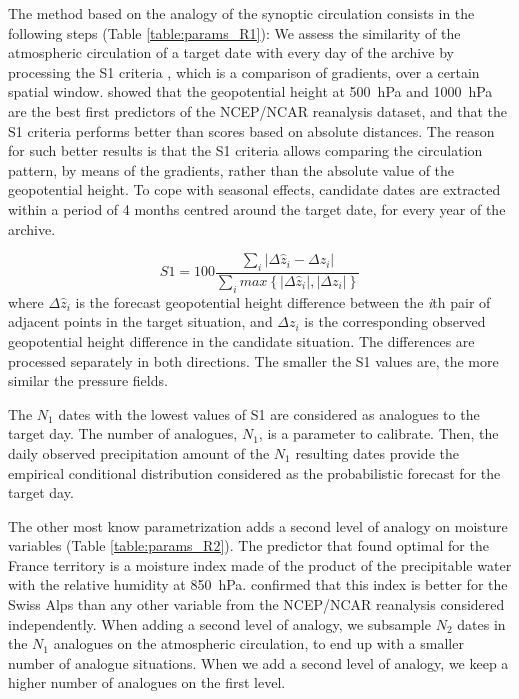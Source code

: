 \documentclass{ametsoc}
\begin{document}
The method based on the analogy of the synoptic circulation consists in the following steps (Table \ref{table:params_R1}): We assess the similarity of the atmospheric circulation of a target date with every day of the archive by processing the S1 criteria \citep[Eq.\ (\ref{eq:S1}), ][]{Teweles1954, Drosdowsky2003}, which is a comparison of gradients, over a certain spatial window. \citet{Bontron2005} showed that the geopotential height at 500~hPa and 1000~hPa are the best first predictors of the NCEP/NCAR reanalysis dataset, and that the S1 criteria performs better than scores based on absolute distances. The reason for such better results is that the S1 criteria allows comparing the circulation pattern, by means of the gradients, rather than the absolute value of the geopotential height. To cope with seasonal effects, candidate dates are extracted within a period of 4 months centred around the target date, for every year of the archive.

\begin{equation}
\label{eq:S1}
S1=100 \frac {\displaystyle \sum_{i} \vert \Delta\hat{z}_{i} - \Delta z_{i} \vert}
{\displaystyle \sum_{i} max\left\lbrace \vert \Delta\hat{z}_{i} \vert , \vert \Delta z_{i} \vert \right\rbrace }
\end{equation}
where $\Delta \hat{z}_{i}$ is the forecast geopotential height difference between the \textit{i}th pair of adjacent points in the target situation, and $\Delta z_{i}$ is the corresponding observed geopotential height difference in the candidate situation. The differences are processed separately in both directions. The smaller the S1 values are, the more similar the pressure fields.

The $N_{1}$ dates with the lowest values of S1 are considered as analogues to the target day. The number of analogues, $N_{1}$, is a parameter to calibrate. Then, the daily observed precipitation amount of the $N_{1}$ resulting dates provide the empirical conditional distribution considered as the probabilistic forecast for the target day.

The other most know parametrization adds a second level of analogy on moisture variables (Table \ref{table:params_R2}). The predictor that \citet{Bontron2004} found optimal for the France territory is a moisture index made of the product of the precipitable water with the relative humidity at 850~hPa. \cite{Horton2012a} confirmed that this index is better for the Swiss Alps than any other variable from the NCEP/NCAR reanalysis considered independently. When adding a second level of analogy, we subsample $N_{2}$ dates in the $N_{1}$ analogues on the atmospheric circulation, to end up with a smaller number of analogue situations. When we add a second level of analogy, we keep a higher number of analogues on the first level.
\end{document}
